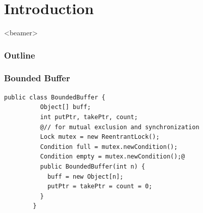 \documentclass[mathserif,14pt,xcolor=table]{beamer}
\begin{document}
\section{Introduction}

    \begin{frame}<beamer>
        \frametitle{Outline}
        \tableofcontents[
            currentsubsection,
        ]
    \end{frame}
%    

\begin{frame}[fragile]
    \frametitle{Bounded Buffer}
    \begin{lstlisting}[style=base]
        public class BoundedBuffer {
          Object[] buff;
          int putPtr, takePtr, count;
          @// for mutual exclusion and synchronization 
          Lock mutex = new ReentrantLock();
          Condition full = mutex.newCondition();
          Condition empty = mutex.newCondition();@
          public BoundedBuffer(int n) {
            buff = new Object[n];
            putPtr = takePtr = count = 0;
          }
        }
    \end{lstlisting}
\end{frame}
\end{document}

